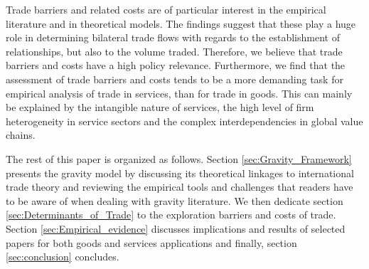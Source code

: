 Trade barriers and related costs are of particular interest in the empirical literature and in theoretical models. The findings suggest that these play a huge role in determining bilateral trade flows with regards to the establishment of relationships, but also to the volume traded. Therefore, we believe that trade barriers and costs have a high policy relevance. Furthermore, we find that the assessment of trade barriers and costs tends to be a more demanding task for empirical analysis of trade in services, than for trade in goods. This can mainly be explained by the intangible nature of services, the high level of firm heterogeneity in service sectors and the complex interdependencies in global value chains.


The rest of this paper is organized as follows. Section \ref{sec:Gravity_Framework} presents the gravity model by discussing its theoretical linkages to international trade theory and reviewing the empirical tools and challenges that readers have to be aware of when dealing with gravity literature. We then dedicate section \ref{sec:Determinants_of_Trade} to the exploration barriers and costs of trade. Section \ref{sec:Empirical_evidence} discusses implications and results of selected papers for both goods and services applications and finally, section \ref{sec:conclusion} concludes.














































































